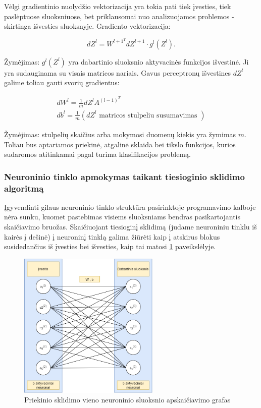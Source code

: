 \documentclass[a4paper, 12pt]{article}
\begin{document}
Vėlgi gradientinio nuolydžio vektorizacija yra tokia pati tiek įvesties, tiek paslėptuose sluoksniuose, bet priklausomai nuo analizuojamos problemos - skirtinga išvesties sluoksnyje. Gradiento vektorizacija:

\begin{equation}
\label{eqn:backpropdz}
d Z^{l}=W^{l+1^{T}} d Z^{l+1} \cdot g^{l}\left(Z^{l}\right).
\end{equation}

Žymėjimas: $g^l(Z^l)$ yra dabartinio sluoksnio aktyvacinės funkcijos išvestinė. Ji yra sudauginama su visais matricos nariais. Gavus perceptronų išvestines $dZ^l$ galime toliau gauti svorių gradientus:


\begin{equation}
\label{eqn:backprop}
\begin{gathered}
d W^{l}=\frac{1}{m} d Z^{l} A^{(l-1)^{T}} \\
d b^{l}=\frac{1}{m}\left(d Z^{l} \text { matricos stulpeliu susumavimas }\right)
\end{gathered}
\end{equation}



Žymėjimas: stulpelių skaičius arba mokymosi duomenų kiekis yra žymimas $m$. Toliau bus aptariamos priekinė, atgalinė sklaida bei tikslo funkcijos, kurios sudaromos atitinkamai pagal turima klasifikacijos problemą.

%
\subsubsection{Neuroninio tinklo apmokymas taikant tiesioginio sklidimo algoritmą}
%

Įgyvendinti gilaus neuroninio tinklo struktūra pasirinktoje programavimo kalboje nėra sunku, kuomet pastebimas visiems sluoksniams bendras pasikartojantis skaičiavimo bruožas. Skaičiuojant tiesioginį sklidimą (judame neuroniniu tinklu iš kairės į dešinė) į neuroninį tinklą galima žiūrėti kaip į atskirus blokus susidedančius iš įvesties bei išvesties, kaip tai matosi \ref{forwardProp} paveikslėlyje.
\clearpage
\begin{figure}[h]
\centering
\includegraphics[width=0.6\textwidth]{ForwardProp}
\caption{Priekinio sklidimo vieno neuroninio sluoksnio apskaičiavimo grafas}
\label{forwardProp}
\end{figure}
\end{document}
